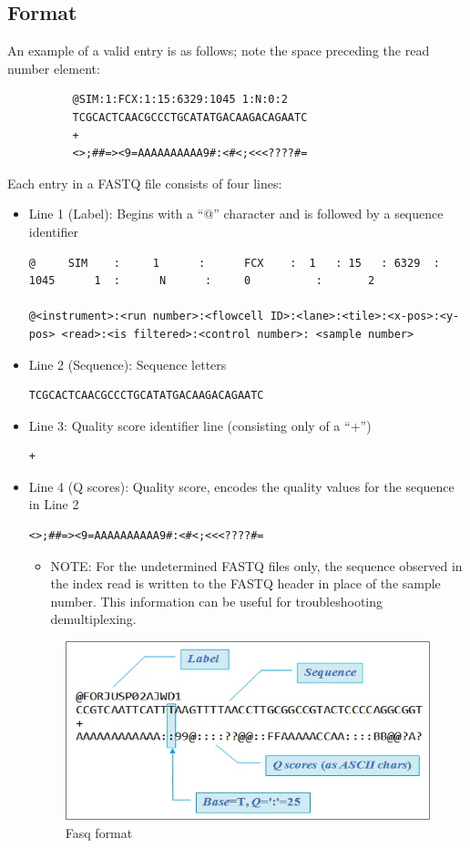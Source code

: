 \documentclass{article}
\begin{document}
\subsection{Format} 
An example of a valid entry is as follows; note the space preceding the read number element:
\begin{verbatim}
          @SIM:1:FCX:1:15:6329:1045 1:N:0:2
          TCGCACTCAACGCCCTGCATATGACAAGACAGAATC
          +
          <>;##=><9=AAAAAAAAAA9#:<#<;<<<????#=
\end{verbatim}
Each entry in a FASTQ file consists of four lines:
\begin{itemize}
\item Line 1 (Label): Begins with a ``@'' character and is followed by a sequence identifier
\scriptsize
\begin{verbatim}
@     SIM    :     1      :      FCX    :  1   : 15   : 6329  : 1045      1  :      N      :     0          :       2

@<instrument>:<run number>:<flowcell ID>:<lane>:<tile>:<x-pos>:<y-pos> <read>:<is filtered>:<control number>: <sample number>
\end{verbatim}
\normalsize
\item Line 2 (Sequence): Sequence letters
\begin{verbatim}
TCGCACTCAACGCCCTGCATATGACAAGACAGAATC
\end{verbatim}

\item Line 3: Quality score identifier line (consisting only of a ``+'')
\begin{verbatim}
+
\end{verbatim}
\item Line 4 (Q scores): Quality score, encodes the quality values for the sequence in Line 2
\begin{verbatim}
<>;##=><9=AAAAAAAAAA9#:<#<;<<<????#=
\end{verbatim}
\begin{itemize}
 \item NOTE:
For the undetermined FASTQ files only, the sequence observed in the index read is written to the FASTQ header in place of the sample number.
This information can be useful for troubleshooting demultiplexing.
\end{itemize}

\begin{figure}[htp]
    \centering
    \includegraphics[width=.6\textwidth, height=.3\textwidth]{Fastq_1.png}
    \caption*{Fasq format}
    \label{fastq_1}
\end{figure}
\end{itemize}
\end{document}
